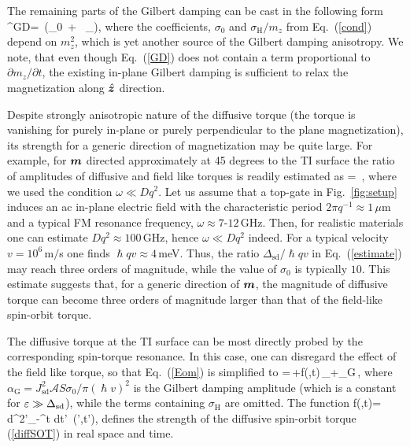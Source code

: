 The remaining parts of the Gilbert damping can be cast in the following form 
\be
{}^\textrm{GD}=\,\times
\Big(\sigma_0\, + \, \times{}_\perp \Big),
\label{GD}
\e
where the coefficients, $\sigma_0$ and $\sigma_\textrm{H}/m_z$ from Eq.~(\ref{cond}) depend on $m_z^2$, which is yet another source of the Gilbert damping anisotropy.  We note, that even though Eq.~(\ref{GD}) does not contain a term proportional to $\partial m_z/\partial t$, the existing in-plane Gilbert damping is sufficient to relax the magnetization along $\hat{\boldsymbol{z}}$ direction. 

Despite strongly anisotropic nature of the diffusive torque (the torque is vanishing for purely in-plane or purely perpendicular to the plane magnetization), its strength for a generic direction of magnetization may be quite large. For example, for $\boldsymbol{m}$ directed approximately at 45 degrees to the TI surface the ratio of amplitudes of diffusive and field like torques is readily estimated as  
\be
\label{estimate}
 = \,,
\e
where we used the condition $\omega \ll Dq^2$.  Let us assume that a top-gate in Fig.~\ref{fig:setup} induces an ac in-plane electric field with the characteristic period $2\pi q^{-1}\approx 1$\,$\mu$m and a typical FM resonance frequency, $\omega\approx 7$-$12$\,GHz. Then, for realistic materials one can estimate $Dq^2\approx 100$\,GHz, hence $\omega \ll Dq^2$ indeed. For a typical velocity $v=10^6$\,m$/$s one finds  $\hslash q v\approx 4$\,meV. Thus, the ratio $\Delta_\textrm{sd}/\hslash q v$ in Eq.~(\ref{estimate}) may reach three orders of magnitude, while the value of $\sigma_0$ is typically $10$. This estimate suggests that, for a generic direction of $\boldsymbol{m}$, the magnitude of diffusive  torque can become three orders of magnitude larger than that of the field-like spin-orbit torque. 

The diffusive torque at the TI surface can be most directly probed by the corresponding spin-torque resonance. In this case, one can disregard the effect of the field like torque, so that Eq.~(\ref{Eom}) is simplified to
\be
\label{equation}
=\gamma\,\times {}+f(,t)\,\times{}_\perp+\alpha_\textrm{G}\,\times{},
\e
where $\alpha_\textrm{G}= J_\textrm{sd}^2 \mathcal{A}S \sigma_0/\pi(\hslash v)^2$ is the Gilbert damping amplitude (which is a constant for $\varepsilon \gg \Delta_\textrm{sd}$), while the terms containing $\sigma_\textrm{H}$ are omitted.  The function
\be
f(,t)=\eta\int\! d^2'\!\!\int_{-\infty}^t\!\!\!\! dt'\, \bb{\nabla}\cdot{}(',t'),\n
\e
defines the strength of the diffusive spin-orbit torque (\ref{diffSOT}) in real space and time.

